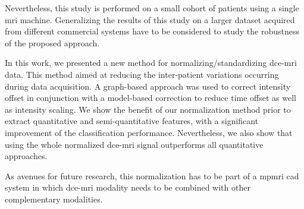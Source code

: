 Nevertheless, this study is performed on a small cohort of patients using a single \ac{mri} machine.
Generalizing the results of this study on a larger dataset acquired from different commercial systems have to be considered to study the robustness of the proposed approach.



In this work, we presented a new method for normalizing/standardizing \ac{dce}-\ac{mri} data.
This method aimed at reducing the inter-patient variations occurring during data acquisition.
A graph-based approach was used to correct intensity offset in conjunction with a model-based correction to reduce time offset as well as intensity scaling.
We show the benefit of our normalization method prior to extract quantitative and semi-quantitative features, with a significant improvement of the classification performance.
Nevertheless, we also show that using the whole normalized \ac{dce}-\ac{mri} signal outperforms all quantitative approaches.

As avenues for future research, this normalization has to be part of a \ac{mpmri} \ac{cad} system in which \ac{dce}-\ac{mri} modality needs to be combined with other complementary modalities.
